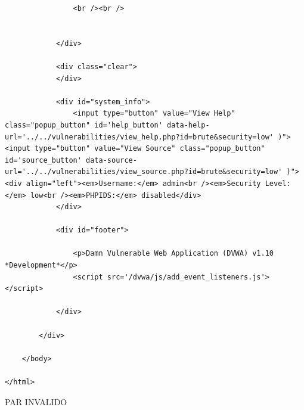 \documentclass[letter,12pt]{article}
\begin{document}
\begin{verbatim}
				<br /><br />
				

			</div>

			<div class="clear">
			</div>

			<div id="system_info">
				<input type="button" value="View Help" class="popup_button" id='help_button' data-help-url='../../vulnerabilities/view_help.php?id=brute&security=low' )"> <input type="button" value="View Source" class="popup_button" id='source_button' data-source-url='../../vulnerabilities/view_source.php?id=brute&security=low' )"> <div align="left"><em>Username:</em> admin<br /><em>Security Level:</em> low<br /><em>PHPIDS:</em> disabled</div>
			</div>

			<div id="footer">

				<p>Damn Vulnerable Web Application (DVWA) v1.10 *Development*</p>
				<script src='/dvwa/js/add_event_listeners.js'></script>

			</div>

		</div>

	</body>

</html>
\end{verbatim}
PAR INVALIDO
\end{document}
